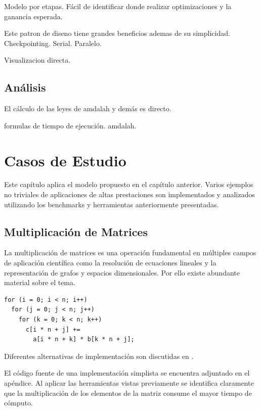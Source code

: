\documentclass[a4paper]{report}
\begin{document}
Modelo por etapas. F\'acil de identificar donde realizar optimizaciones y la
ganancia esperada.


Este patron de diseno tiene grandes beneficios ademas de su simplicidad. Checkpointing. Serial. Paralelo. 

Visualizacion directa.

\section{An\'alisis}

 El c\'alculo de las leyes de amdalah y dem\'as es directo.


\bigskip

formulas de tiempo de ejecuci\'on. amdalah.

\chapter{Casos de Estudio}

Este cap\'itulo aplica el modelo propuesto en el cap\'itulo anterior. Varios ejemplos no triviales de aplicaciones de altas prestaciones son implementados
y analizados utilizando los benchmarks y herramientas anteriormente presentadas.

\section{Multiplicaci\'on de Matrices}

La multiplicaci\'on de matrices es una operaci\'on fundamental en m\'ultiples
campos de aplicaci\'on cient\'ifica como la resoluci\'on de ecuaciones
lineales y la representaci\'on de grafos y espacios dimensionales. Por ello
existe abundante material sobre el tema.

\begin{verbatim}
for (i = 0; i < n; i++)
  for (j = 0; j < n; j++)
    for (k = 0; k < n; k++)
      c[i * n + j] += 
        a[i * n + k] * b[k * n + j];
\end{verbatim}

Diferentes alternativas de implementaci\'on son discutidas en
\cite{mm-matrixmultiplicationtool}.

\bigskip

El c\'odigo fuente de una implementaci\'on simplista se encuentra adjuntado en
el ap\'endice. Al aplicar las herramientas vistas previamente se identifica
claramente que la multiplicaci\'on de los elementos de la matriz consume el
mayor tiempo de c\'omputo.
\end{document}
